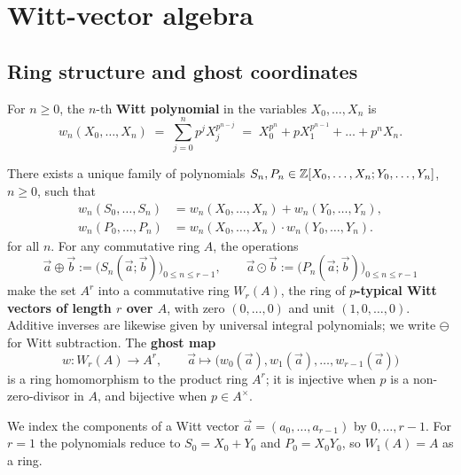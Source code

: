\section{Witt-vector algebra}

\subsection{Ring structure and ghost coordinates}

For $n \geq 0$, the $n$-th \textbf{Witt polynomial} in the variables $X_0, \dots, X_n$
is
\[
w_n(X_0, \dots, X_n) \;=\; \sum_{j=0}^{n} p^j X_j^{p^{n-j}}
\;=\; X_0^{p^n} + p X_1^{p^{n-1}} + \dots + p^n X_n .
\]

\begin{theorem}
\label{theorem:witt_ring_structure}
There exists a unique family of polynomials
$S_n, P_n \in \mathbb{Z}[X_0, \dots, X_n; Y_0, \dots, Y_n]$, $n \geq 0$, such that
\[
\begin{aligned}
w_n(S_0, \dots, S_n)
    &= w_n(X_0,\dots,X_n) + w_n(Y_0,\dots,Y_n),\\
w_n(P_0, \dots, P_n)
    &= w_n(X_0,\dots,X_n) \cdot w_n(Y_0,\dots,Y_n).
\end{aligned}
\]
for all $n$. For any commutative ring $A$, the operations
\[
\vec a \oplus \vec b := \bigl(S_n(\vec a; \vec b)\bigr)_{0 \le n \le r-1},
\qquad
\vec a \odot \vec b := \bigl(P_n(\vec a; \vec b)\bigr)_{0 \le n \le r-1}
\]
make the set $A^r$ into a commutative ring $W_r(A)$, the ring of \textbf{$p$-typical
Witt vectors of length $r$ over $A$}, with zero $(0, \dots, 0)$ and unit
$(1, 0, \dots, 0)$. Additive inverses are likewise given by universal integral
polynomials; we write $\ominus$ for Witt subtraction. The \textbf{ghost map}
\[
w \colon W_r(A) \longrightarrow A^r,
\qquad
\vec a \longmapsto \bigl(w_0(\vec a), w_1(\vec a), \dots, w_{r-1}(\vec a)\bigr)
\]
is a ring homomorphism to the product ring $A^r$; it is injective when $p$ is a
non-zero-divisor in $A$, and bijective when $p \in A^\times$.
\end{theorem}

We index the components of a Witt vector $\vec a = (a_0, \dots, a_{r-1})$ by
$0, \dots, r-1$. For $r = 1$ the polynomials reduce to $S_0 = X_0 + Y_0$ and
$P_0 = X_0 Y_0$, so $W_1(A) = A$ as a ring.


